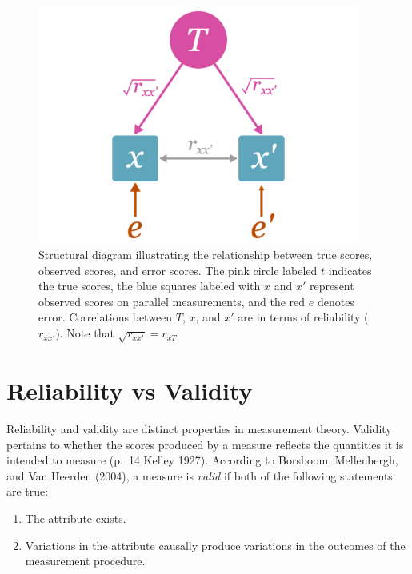 \documentclass[
  letterpaper,
  DIV=11,
  numbers=noendperiod]{scrreprt}
\begin{document}
\begin{figure}

{\centering \includegraphics[width=4.16667in,height=\textheight]{figure/unreliability_diagram_1.png}

}

\caption{Structural diagram illustrating the relationship between true
scores, observed scores, and error scores. The pink circle labeled \(t\)
indicates the true scores, the blue squares labeled with \(x\) and
\(x'\) represent observed scores on parallel measurements, and the red
\(e\) denotes error. Correlations between \(T\), \(x\), and \(x'\) are
in terms of reliability (\(r_{xx'}\)). Note that
\(\sqrt{r_{xx'}}=r_{xT}\).}

\end{figure}

\hypertarget{reliability-vs-validity}{%
\section{Reliability vs Validity}\label{reliability-vs-validity}}

Reliability and validity are distinct properties in measurement theory.
Validity pertains to whether the scores produced by a measure reflects
the quantities it is intended to measure (p.~14 Kelley 1927). According
to Borsboom, Mellenbergh, and Van Heerden (2004), a measure is
\emph{valid} if both of the following statements are true:

\begin{enumerate}
\def\labelenumi{\arabic{enumi}.}
\item
  The attribute exists.
\item
  Variations in the attribute causally produce variations in the
  outcomes of the measurement procedure.
\end{enumerate}
\end{document}
